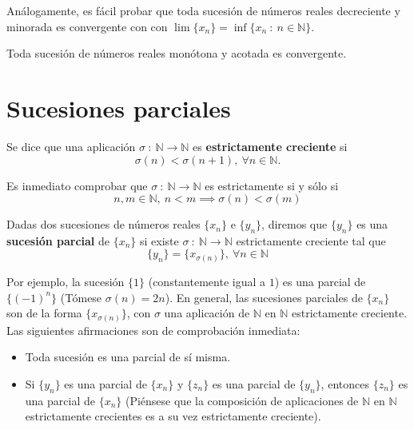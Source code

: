 Análogamente, es fácil probar que toda sucesión de números reales decreciente y minorada es convergente con
con $\lim \{x_n\}=\inf \{x_n ~:~ n \in \mathbb{N}\}$.
\begin{coro}\label{coro:6.1.5}
    Toda sucesión de números reales monótona y acotada es convergente.
\end{coro}



\section{Sucesiones parciales}
\begin{definicion}
    Se dice que una aplicación $\sigma ~:~ \mathbb{N} \longrightarrow \mathbb{N}$ es \textbf{estrictamente creciente} si
    \begin{equation*}
        \sigma(n) < \sigma(n+1), ~ \forall n \in \mathbb{N}.
    \end{equation*}
\end{definicion}

Es inmediato comprobar que $\sigma ~:~ \mathbb{N} \longrightarrow \mathbb{N}$ es estrictamente si y sólo si
\begin{equation*}
    n,m \in \mathbb{N}, ~ n < m \implies \sigma(n) < \sigma(m)
\end{equation*}

\begin{definicion}
    Dadas dos sucesiones de números reales $\{x_n\}$ e $\{y_n\}$, diremos que $\{y_n\}$ es una \textbf{sucesión parcial} de $\{x_n\}$ si existe $\sigma ~:~ \mathbb{N} \longrightarrow \mathbb{N}$ estrictamente creciente tal que
    \begin{equation*}
        \{y_n\} = \{x_{\sigma(n)}\}, ~\forall n \in \mathbb{N}
    \end{equation*}
\end{definicion}

Por ejemplo, la sucesión $\{1\}$ (constantemente igual a $1$) es una parcial de $\{(-1)^n\}$ (Tómese $\sigma(n)=2n$). En general, las sucesiones parciales de $\{x_n\}$ son de la forma $\{x_{\sigma(n)}\}$, con $\sigma$ una aplicación de $\mathbb{N}$ en $\mathbb{N}$ estrictamente creciente.\\

Las siguientes afirmaciones son de comprobación inmediata:
\begin{itemize}
    \item Toda sucesión es una parcial de sí misma.
    \item Si $\{y_n\}$ es una parcial de $\{x_n\}$ y $\{z_n\}$ es una parcial de $\{y_n\}$, entonces $\{z_n\}$ es una parcial de $\{x_n\}$ (Piénsese que la composición de aplicaciones de $\mathbb{N}$ en $\mathbb{N}$ estrictamente crecientes es a su vez estrictamente creciente).
\end{itemize}

